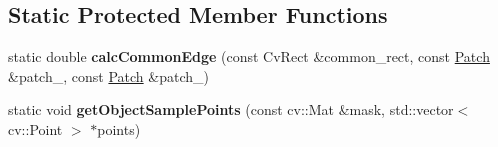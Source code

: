\subsection*{Static Protected Member Functions}
\begin{DoxyCompactItemize}
\item 
\hypertarget{classskl_1_1_patch_model_aa6f2a5d23c0402c064a9d31eca29b23f}{}\label{classskl_1_1_patch_model_aa6f2a5d23c0402c064a9d31eca29b23f} 
static double {\bfseries calc\+Common\+Edge} (const Cv\+Rect \&common\+\_\+rect, const \hyperlink{classskl_1_1_patch}{Patch} \&patch\+\_, const \hyperlink{classskl_1_1_patch}{Patch} \&patch\+\_)
\item 
\hypertarget{classskl_1_1_patch_model_a4f0ce6af9380ddd1341cd0b456aa73b1}{}\label{classskl_1_1_patch_model_a4f0ce6af9380ddd1341cd0b456aa73b1} 
static void {\bfseries get\+Object\+Sample\+Points} (const cv\+::\+Mat \&mask, std\+::vector$<$ cv\+::\+Point $>$ $\ast$points)
\end{DoxyCompactItemize}

